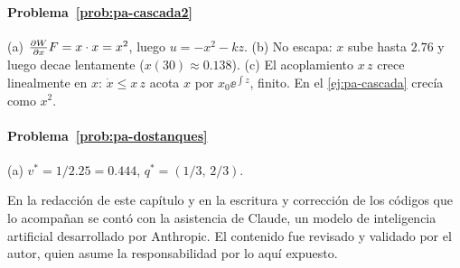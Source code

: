 \paragraph{Problema~\ref{prob:pa-cascada2}}
(a) $\frac{\partial W}{\partial x}F=x\cdot x=x^2$, luego $u=-x^2-kz$. (b) No escapa: $x$ sube hasta $2.76$ y luego decae lentamente ($x(30)\approx0.138$). (c) El acoplamiento $x\,z$ crece linealmente en $x$: $\dot x\le x\,z$ acota $x$ por $x_0\ee^{\int z}$, finito. En el \cref{ej:pa-cascada} crecía como $x^2$.

\paragraph{Problema~\ref{prob:pa-dostanques}}
(a) $v^*=1/2.25=0.444$, $q^*=(1/3,\,2/3)$.

\respuestaspausas

\begin{parallevar}
En la redacción de este capítulo y en la escritura y corrección de los códigos que lo acompañan se contó con la asistencia de Claude, un modelo de inteligencia artificial desarrollado por Anthropic. El contenido fue revisado y validado por el autor, quien asume la responsabilidad por lo aquí expuesto.
\end{parallevar}
